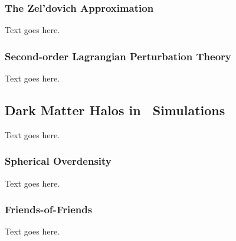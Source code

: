 \subsubsection{The Zel'dovich Approximation}
\label{subsubsec:computational_theory--simulation_initialization--za_theory}


Text goes here.



\subsubsection{Second-order Lagrangian Perturbation Theory}
\label{subsubsec:computational_theory--simulation_initialization--2lpt_theory}


Text goes here.




\subsection{Dark Matter Halos in \nbody\ Simulations}
\label{subsec:computational_theory--halos_in_nbody_simulations}


Text goes here.



\subsubsection{Spherical Overdensity}
\label{subsubsec:computational_theory--halos_in_nbody_simulations--spherical_overdensity}


Text goes here.



\subsubsection{Friends-of-Friends}
\label{subsubsec:computational_theory--halos_in_nbody_simulations--friends-of-friends}


Text goes here.





